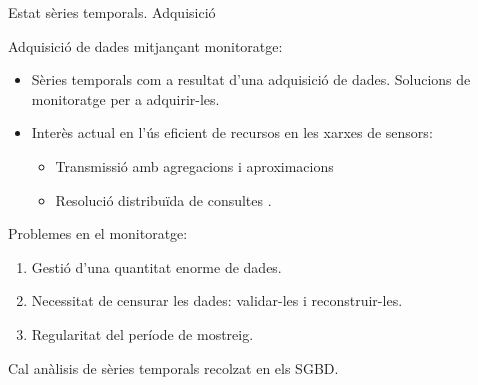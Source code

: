 \begin{frame}{Estat sèries temporals. Adquisició}

  Adquisició de dades mitjançant monitoratge:

  \begin{itemize}

  \item Sèries temporals com a resultat d'una adquisició de
    dades. Solucions de monitoratge per a adquirir-les.

  \item Interès actual en l'ús eficient de recursos en les xarxes de
    sensors: 
    \begin{itemize}
    \item Transmissió amb agregacions i
      aproximacions \parencite{deligiannakis07}
    \item Resolució distribuïda de consultes \parencite{bonnet01}.
    \end{itemize}

  \end{itemize}
  
    Problemes en el monitoratge:
    \begin{enumerate}

    \item Gestió d'una quantitat enorme de dades. 

    \item Necessitat de censurar les dades: validar-les i reconstruir-les.

    \item Regularitat del període de mostreig.

    \end{enumerate}
  

  Cal anàlisis de sèries temporals recolzat en els SGBD.



\end{frame}



